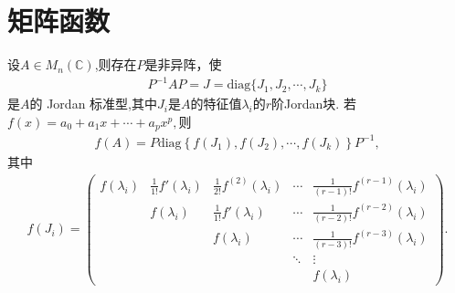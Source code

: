 \documentclass[../../main.tex]{subfiles}
\begin{document}
\section{矩阵函数}

\begin{lemma}\label{lemma:利用Jordan标准型计算复矩阵的多项式}
设$A\in M_n(\mathbb{C})$,则存在\(P\)是非异阵，使
\begin{align*}
P^{-1}AP = J = \mathrm{diag}\{J_1,J_2,\cdots,J_k\}
\end{align*}
是\(A\)的 Jordan 标准型,其中$J_i$是$A$的特征值$\lambda_i$的$r$阶Jordan块.
若$f(x)=a_0+a_1x+\cdots+a_px^p,$则
\begin{align*}
f(A)=P\mathrm{diag}\left\{ f\left( J_1 \right) ,f\left( J_2 \right) ,\cdots ,f\left( J_k \right) \right\} P^{-1},
\end{align*}
其中
\begin{align*}
f(J_i)= \begin{pmatrix}
f(\lambda_i) & \frac{1}{1!}f'(\lambda_i) & \frac{1}{2!}f^{(2)}(\lambda_i) & \cdots & \frac{1}{(r - 1)!}f^{(r - 1)}(\lambda_i) \\
 & f(\lambda_i) & \frac{1}{1!}f'(\lambda_i) & \cdots & \frac{1}{(r - 2)!}f^{(r - 2)}(\lambda_i) \\
 & & f(\lambda_i) & \cdots & \frac{1}{(r - 3)!}f^{(r - 3)}(\lambda_i) \\
 & & & \ddots & \vdots \\
 & & & & f(\lambda_i)
\end{pmatrix}. 
\end{align*}
\end{lemma}
\end{document}

